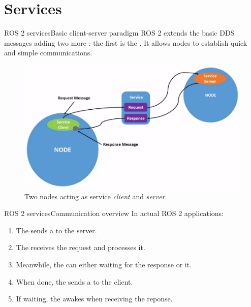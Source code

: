 
\section{Services}
\graphicspath{{figs/section2/}}

\begin{frame}{ROS 2 services}{Basic client-server paradigm}
  ROS 2 extends the basic DDS messages adding two more : the first is the . It allows nodes to establish quick and simple  communications.
  \begin{figure}
    \centering
    \includegraphics[scale=.33]{ros2Srv.png}
    \caption{Two nodes acting as service \emph{client} and \emph{server}.}
    \label{fig:ros2srv}
  \end{figure}
\end{frame}
\begin{frame}{ROS 2 services}{Communication overview}
  In actual ROS 2 applications:
  \begin{enumerate}
    \item The  sends a  to the server.
    \item The  receives the request and processes it.
    \item Meanwhile, the  can either  waiting for the response or  it.
    \item When done, the  sends a  to the client.
    \item If waiting, the  awakes when receiving the reponse.
  \end{enumerate}
\end{frame}
